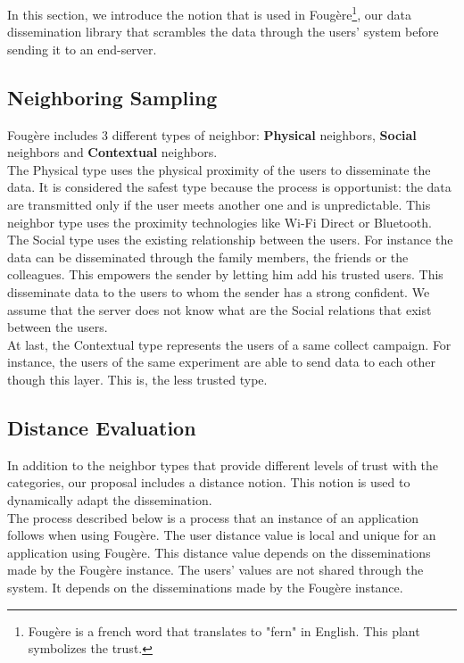 

In this section, we introduce the notion that is used in Foug\`ere\footnote{Foug\`ere is a french word that translates to "fern" in English. This plant symbolizes the trust.}, our data dissemination library that scrambles the data through the users' system before sending it to an end-server.

\subsection{Neighboring Sampling}

Foug\`ere includes 3 different types of neighbor: \textbf{Physical} neighbors, \textbf{Social} neighbors and \textbf{Contextual} neighbors.
\\

The Physical type uses the physical proximity of the users to disseminate the data.
It is considered the safest type because the process is opportunist: the data are transmitted only if the user meets another one and is unpredictable.
This neighbor type uses the proximity technologies like Wi-Fi Direct or Bluetooth.
\\

The Social type uses the existing relationship between the users.
For instance the data can be disseminated through the family members, the friends or the colleagues.
This empowers the sender by letting him add his trusted users.
This disseminate data to the users to whom the sender has a strong confident.
We assume that the server does not know what are the Social relations that exist between the users.
\\

At last, the Contextual type represents the users of a same collect campaign.
For instance, the users of the same experiment are able to send data to each other though this layer. 
This is, the less trusted type.

\subsection{Distance Evaluation}

In addition to the neighbor types that provide different levels of trust with the categories, our proposal includes a distance notion.
This notion is used to dynamically adapt the dissemination.
\\

The process described below is a process that an instance of an application follows when using Foug\`ere.
The user distance value is local and unique for an application using Foug\`ere.
This distance value depends on the disseminations made by the Foug\`ere instance.
The users' values are not shared through the system.
It depends on the disseminations made by the Foug\`ere instance.
\\

